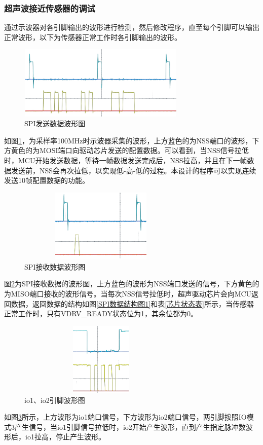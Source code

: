 \subsubsection{超声波接近传感器的调试}
通过示波器对各引脚输出的波形进行检测，然后修改程序，直至每个引脚可以输出正常波形，以下为传感器正常工作时各引脚输出的波形。\par
\begin{figure}[!h]
	\centering
	\includegraphics[width=8cm,height=3.5cm]{figure/debug waveform1.png}
	\caption{SPI发送数据波形图}
	\label{SPI发送数据波形图}
\end{figure}\par
如图\ref{SPI发送数据波形图}，为采样率100MHz时示波器采集的波形，上方蓝色的为NSS端口的波形，下方黄色的为MOSI端口向驱动芯片发送的配置数据。可以看到，当NSS信号拉低时，MCU开始发送数据，等待一帧数据发送完成后，NSS拉高，并且在下一帧数据发送前，NSS会再次拉低，以实现低-高-低的过程。本设计的程序可以实现连续发送10帧配置数据的功能。
\begin{figure}[!h]
	\centering
	\includegraphics[width=8cm,height=3.5cm]{figure/debug waveform2.png}
	\caption{SPI接收数据波形图}
	\label{SPI接收数据波形图}
\end{figure}\par
图\ref{SPI接收数据波形图}为SPI接收数据的波形图，上方蓝色的波形为NSS端口发送的信号，下方黄色的为MISO端口接收的波形信号。当每次NSS信号拉低时，超声驱动芯片会向MCU返回数据，返回数据的结构如图\ref{SPI数据结构图1}和表\ref{芯片状态表}所示，当传感器正常工作时，只有VDRV\_READY状态位为1，其余位都为0。
\newpage
\begin{figure}[!h]
	\centering
	\includegraphics[width=8cm,height=3.5cm]{figure/debug waveform9.png}
	\caption{io1、io2引脚波形图}
	\label{io1、io2引脚波形图}
\end{figure}\par
如图\ref{io1、io2引脚波形图}所示，上方波形为io1端口信号，下方波形为io2端口信号，两引脚按照IO模式3产生信号，当io1引脚信号拉低时，io2开始产生波形，直到产生指定脉冲数波形后，io1拉高，停止产生波形。

